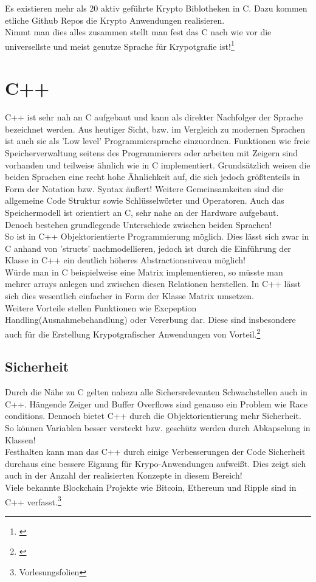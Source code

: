 \documentclass[a4paper,12pt]{scrartcl}
\begin{document}
Es existieren mehr als 20 aktiv geführte Krypto Biblotheken in C. Dazu kommen etliche Github Repos die Krypto Anwendungen realisieren.\\
Nimmt man dies alles zusammen stellt man fest das C nach wie vor die universellste und meist genutze Sprache für Krypotgrafie ist!\footnote{\cite{1028896}}

\newpage
\section{C++}
C++ ist sehr nah an C aufgebaut und kann als direkter Nachfolger der Sprache bezeichnet werden. Aus heutiger Sicht, bzw. im Vergleich zu modernen Sprachen ist  auch sie als 'Low level' Programmiersprache einzuordnen. Funktionen wie freie Speicherverwaltung seitens des Programmierers oder arbeiten mit Zeigern sind vorhanden und teilweise ähnlich wie in C implementiert. Grundsätzlich weisen die beiden Sprachen eine recht hohe Ähnlichkeit auf, die sich jedoch größtenteils in Form der Notation bzw. Syntax äußert! Weitere Gemeinsamkeiten sind die allgemeine Code Struktur sowie Schlüsselwörter und Operatoren. Auch das Speichermodell ist orientiert an C, sehr nahe an der Hardware aufgebaut.\\
Denoch bestehen grundlegende Unterschiede zwischen beiden Sprachen!\\
So ist in C++ Objektorientierte Programmierung möglich. Dies lässt sich zwar in C anhand von 'structs' nachmodellieren, jedoch ist durch die Einführung der Klasse in C++ ein deutlich höheres Abstractionsniveau möglich!\\
Würde man in C beispielweise eine Matrix implementieren, so müsste man mehrer arrays anlegen und zwischen diesen Relationen herstellen. In C++ lässt sich dies wesentlich einfacher in Form der Klasse Matrix umsetzen.\\
Weitere Vorteile stellen Funktionen wie Excpeption Handling(Ausnahmebehandlung) oder Vererbung dar. Diese sind insbesondere auch für die Erstellung  Krypotgrafischer Anwendungen von Vorteil.\footnote{\cite{HAMMI2018126}}

\subsection{Sicherheit}
Durch die Nähe zu C gelten nahezu alle Sichersrelevanten Schwachstellen auch in C++. Hängende Zeiger und Buffer Overflows sind genauso ein Problem wie Race conditions. Dennoch bietet C++ durch die Objektorientierung mehr Sicherheit. So können Variablen besser versteckt bzw. geschütz werden durch Abkapselung in Klassen!\\
Festhalten kann man das C++ durch einige Verbesserungen der Code Sicherheit durchaus eine bessere Eignung für Krypo-Anwendungen aufweißt. Dies zeigt sich auch in der Anzahl der realisierten Konzepte in diesem Bereich!\\
Viele bekannte Blockchain Projekte wie Bitcoin, Ethereum und Ripple sind in C++ verfasst.\footnote{Vorlesungsfolien}
\newpage
\end{document}
